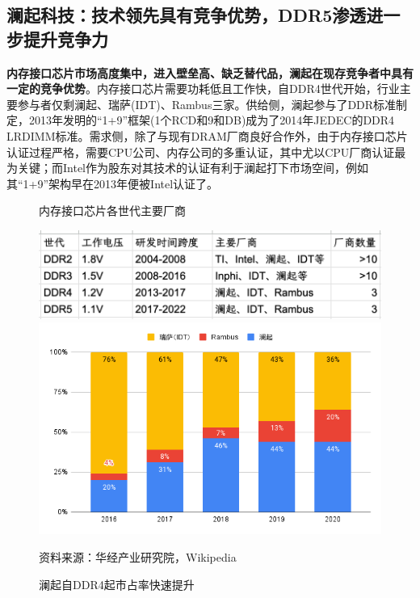 \documentclass[a4paper,12pt]{ctexart}
\begin{document}
\subsection{澜起科技：技术领先具有竞争优势，DDR5渗透进一步提升竞争力}

\textbf{内存接口芯片市场高度集中，进入壁垒高、缺乏替代品，澜起在现存竞争者中具有一定的竞争优势}。内存接口芯片需要功耗低且工作快，自DDR4世代开始，行业主要参与者仅剩澜起、瑞萨(IDT)、Rambus三家。供给侧，澜起参与了DDR标准制定，2013年发明的“1+9”框架(1个RCD和9和DB)成为了2014年JEDEC的DDR4 LRDIMM标准。需求侧，除了与现有DRAM厂商良好合作外，由于内存接口芯片认证过程严格，需要CPU公司、内存公司的多重认证，其中尤以CPU厂商认证最为关键；而Intel作为股东对其技术的认证有利于澜起打下市场空间，例如其“1+9”架构早在2013年便被Intel认证了。
\begin{figure}[H]
    \begin{minipage}{0.48\linewidth}
        \caption{内存接口芯片各世代主要厂商}
        \centering
        \includegraphics[width=\linewidth]{img/ddr.png}
    \end{minipage}
    \begin{minipage}{0.48\linewidth}
        \caption{澜起自DDR4起市占率快速提升}
        \centering
        \includegraphics[width=0.9\linewidth]{img/mktshare.png}
    \end{minipage}
    \par\footnotesize{资料来源：华经产业研究院，Wikipedia}
\end{figure}
\end{document}
